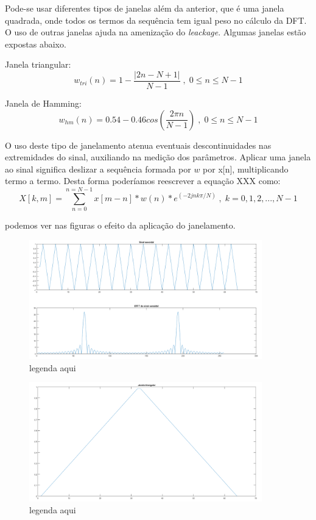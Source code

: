 \documentclass[a4paper, 12pt]{book}
\begin{document}
\indent Pode-se usar diferentes tipos de janelas além da anterior, que é uma janela quadrada, onde todos os termos da sequência tem igual peso no cálculo da DFT. O uso de outras janelas ajuda na amenização do \textit{leackage}. Algumas janelas estão expostas abaixo.

Janela triangular:
\begin{equation}
w_{tri}(n)=1-\frac{|2n-N+1|}{N-1}\;,\;0\leq n \leq N-1
\end{equation}

Janela de Hamming:
\begin{equation}
w_{hm}(n)=0.54-0.46cos(\frac{2\pi n}{N-1})\;,\;0\leq n \leq N-1
\end{equation}

\indent O uso deste tipo de janelamento atenua eventuais descontinuidades nas extremidades do sinal, auxiliando na medição dos parâmetros. Aplicar uma janela ao sinal significa deslizar a sequência formada por $w$ por x[n], multiplicando termo a termo. Desta forma poderíamos reescrever a equação XXX como:
\begin{equation}
X[k,m]=\sum_{n=0}^{n=N-1} x[m-n]*w(n)*e^{(-2jnk\pi/N)}\;,\;k=0,1,2,...,N-1
\end{equation}

\indent podemos ver nas figuras o efeito da aplicação do janelamento.

\begin{figure}[h]
	\centering
	\includegraphics[width=0.9\textwidth]{../figuras/f5.png}
	\caption{legenda aqui}
	\label{fig:f5}
\end{figure}

\begin{figure}[h]
	\centering
	\includegraphics[width=0.9\textwidth]{../figuras/f4.png}
	\caption{legenda aqui}
	\label{fig:f4}
\end{figure}
\end{document}
